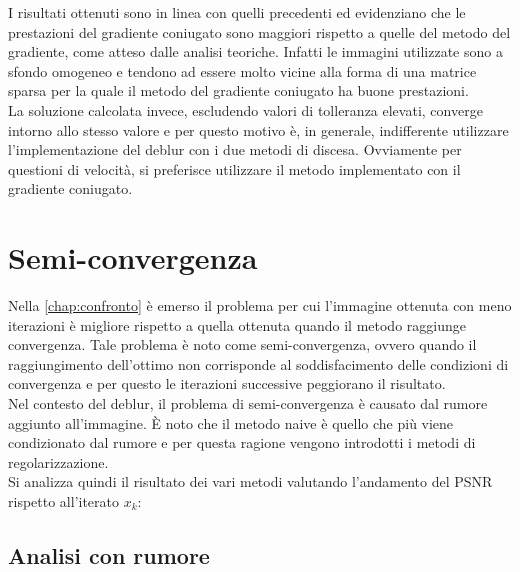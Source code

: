 \documentclass[11pt]{article}
\begin{document}
I risultati ottenuti sono in linea con quelli precedenti ed evidenziano che le prestazioni del gradiente coniugato sono maggiori rispetto a quelle del metodo del gradiente, 
come atteso dalle analisi teoriche. Infatti le immagini utilizzate sono a sfondo omogeneo e tendono ad essere molto vicine alla forma di una matrice sparsa per la quale il metodo del gradiente coniugato ha buone prestazioni.\\
La soluzione calcolata invece, escludendo valori di tolleranza elevati, converge intorno allo stesso valore e per questo motivo è, in generale, indifferente utilizzare l'implementazione del deblur con i due metodi di discesa. Ovviamente per questioni di velocità, si preferisce utilizzare il metodo implementato con il gradiente coniugato.

\section{Semi-convergenza}
\label{chap:semiconv}
Nella \autoref{chap:confronto} è emerso il problema per cui l'immagine ottenuta con meno iterazioni è migliore rispetto a quella ottenuta quando il metodo raggiunge convergenza. 
Tale problema è noto come semi-convergenza, ovvero quando il raggiungimento dell'ottimo non corrisponde al soddisfacimento delle condizioni di convergenza e per questo le iterazioni successive peggiorano il risultato.\\
Nel contesto del deblur, il problema di semi-convergenza è causato dal rumore aggiunto all'immagine. È noto che il metodo naive è quello che più viene condizionato dal rumore e per questa ragione vengono introdotti i metodi di regolarizzazione.\\
Si analizza quindi il risultato dei vari metodi valutando l'andamento del PSNR rispetto all'iterato $x_{k}$:

\subsection{Analisi con rumore}
\end{document}
